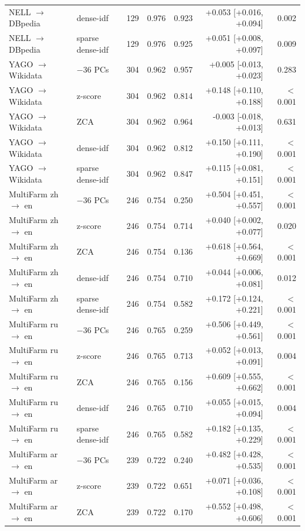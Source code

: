 \begin{longtable}{@{}lllrrrr@{}}
NELL $\to$ DBpedia & dense-idf & 129 & 0.976 & 0.923 & +0.053 [+0.016, +0.094] & 0.002 \\
NELL $\to$ DBpedia & sparse dense-idf & 129 & 0.976 & 0.925 & +0.051 [+0.008, +0.097] & 0.009 \\
YAGO $\to$ Wikidata & $-$36 PCs & 304 & 0.962 & 0.957 & +0.005 [-0.013, +0.023] & 0.283 \\
YAGO $\to$ Wikidata & z-score & 304 & 0.962 & 0.814 & +0.148 [+0.110, +0.188] & $<$0.001 \\
YAGO $\to$ Wikidata & ZCA & 304 & 0.962 & 0.964 & -0.003 [-0.018, +0.013] & 0.631 \\
YAGO $\to$ Wikidata & dense-idf & 304 & 0.962 & 0.812 & +0.150 [+0.111, +0.190] & $<$0.001 \\
YAGO $\to$ Wikidata & sparse dense-idf & 304 & 0.962 & 0.847 & +0.115 [+0.081, +0.151] & $<$0.001 \\
MultiFarm zh $\to$ en & $-$36 PCs & 246 & 0.754 & 0.250 & +0.504 [+0.451, +0.557] & $<$0.001 \\
MultiFarm zh $\to$ en & z-score & 246 & 0.754 & 0.714 & +0.040 [+0.002, +0.077] & 0.020 \\
MultiFarm zh $\to$ en & ZCA & 246 & 0.754 & 0.136 & +0.618 [+0.564, +0.669] & $<$0.001 \\
MultiFarm zh $\to$ en & dense-idf & 246 & 0.754 & 0.710 & +0.044 [+0.006, +0.081] & 0.012 \\
MultiFarm zh $\to$ en & sparse dense-idf & 246 & 0.754 & 0.582 & +0.172 [+0.124, +0.221] & $<$0.001 \\
MultiFarm ru $\to$ en & $-$36 PCs & 246 & 0.765 & 0.259 & +0.506 [+0.449, +0.561] & $<$0.001 \\
MultiFarm ru $\to$ en & z-score & 246 & 0.765 & 0.713 & +0.052 [+0.013, +0.091] & 0.004 \\
MultiFarm ru $\to$ en & ZCA & 246 & 0.765 & 0.156 & +0.609 [+0.555, +0.662] & $<$0.001 \\
MultiFarm ru $\to$ en & dense-idf & 246 & 0.765 & 0.710 & +0.055 [+0.015, +0.094] & 0.004 \\
MultiFarm ru $\to$ en & sparse dense-idf & 246 & 0.765 & 0.582 & +0.182 [+0.135, +0.229] & $<$0.001 \\
MultiFarm ar $\to$ en & $-$36 PCs & 239 & 0.722 & 0.240 & +0.482 [+0.428, +0.535] & $<$0.001 \\
MultiFarm ar $\to$ en & z-score & 239 & 0.722 & 0.651 & +0.071 [+0.036, +0.108] & $<$0.001 \\
MultiFarm ar $\to$ en & ZCA & 239 & 0.722 & 0.170 & +0.552 [+0.498, +0.606] & $<$0.001 \\

\end{longtable}
